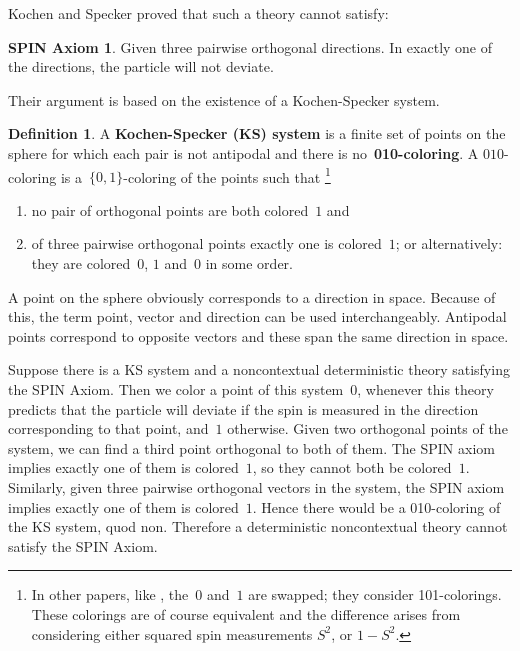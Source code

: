 \documentclass[a4paper]{article}
\newcommand{\keyword}[1]{\textbf{#1}}
\newcounter{main}
\theoremstyle{definition}
\newtheorem{dfn}[main]{Definition}
\newtheorem*{spin}{SPIN Axiom \cite{ck09}}
\theoremstyle{remark}
\begin{document}
Kochen and Specker proved that such a theory cannot satisfy:
\begin{spin}
    Given three pairwise orthogonal directions.
    In exactly one of the directions, the particle will not deviate.
\end{spin}
Their argument is based on the existence of a Kochen-Specker system.
\begin{dfn}
    A \keyword{Kochen-Specker (KS) system} is
    a finite set of points on the sphere
    for which each pair is not antipodal and
    there is no~\keyword{010-coloring}.
    A $010$-coloring is a~$\{0,1\}$-coloring of the points such that
        \footnote{
                In other papers, like \cite{aow11},
                the~$0$ and~$1$ are swapped; they consider 101-colorings.
                These colorings are of course equivalent and the
                difference arises from considering either squared
                spin measurements $S^2$, or $1-S^2$.
               	}
    \begin{enumerate}
        \item
            no pair of orthogonal points are both colored~$1$ and
        \item
            of three pairwise orthogonal points exactly one is colored~$1$;
            or alternatively: they are colored~$0$, $1$ and~$0$ in some order.
    \end{enumerate}
\end{dfn}
A point on the sphere obviously corresponds to a direction in space.
Because of this, the term point, vector and direction
can be used interchangeably. Antipodal points correspond to opposite
vectors and these span the same direction in space.

Suppose there is a KS system and a noncontextual deterministic theory satisfying
the SPIN Axiom.
Then we color a point of this system~$0$,
whenever this theory predicts that the particle will deviate
if the spin is measured in the direction corresponding to that
point, and~$1$ otherwise.
Given two orthogonal points of the system,
we can find a third point orthogonal to both of them.
The SPIN axiom implies exactly one of them is colored~$1$, so they
cannot both be colored~$1$.
Similarly, given three pairwise orthogonal vectors in the system,
the SPIN axiom implies exactly one of them is colored~$1$.
Hence there would be a 010-coloring of the KS system, quod non.
Therefore a deterministic noncontextual theory cannot satisfy the
SPIN Axiom.
\end{document}
